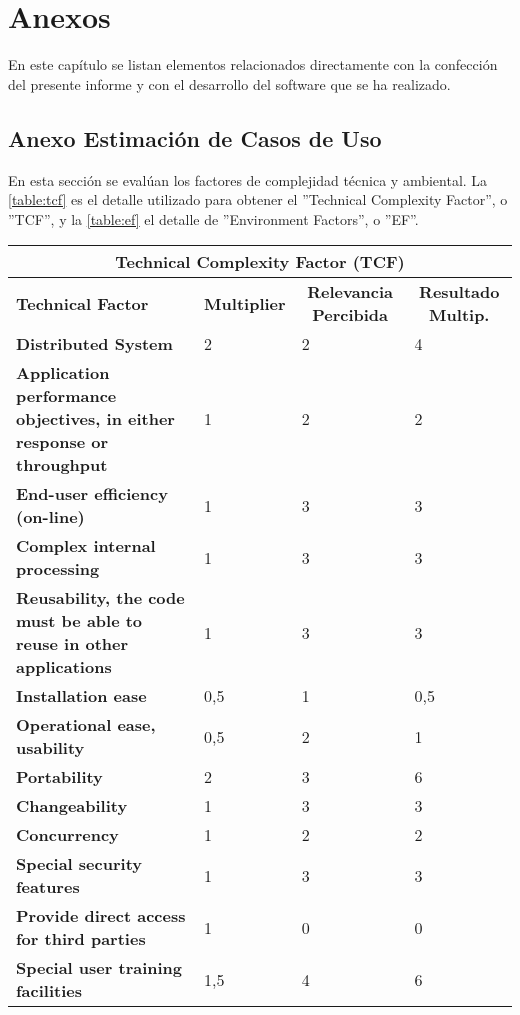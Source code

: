 \chapter{Anexos}
En este capítulo se listan elementos relacionados directamente con la confección del presente informe y con el desarrollo del software que se ha realizado.

\newpage

\section{Anexo Estimación de Casos de Uso}
En esta sección se evalúan los factores de complejidad técnica y ambiental. La \autoref{table:tcf} es el detalle utilizado para obtener el ''Technical Complexity Factor'', o ''TCF'', y la \autoref{table:ef} el detalle de ''Environment Factors'', o ''EF''.

\begin{center}
  \begin{tabular}{ | p{4cm} | p{2cm} | p{4cm}| p{4cm} | } 
    \hline
    \multicolumn{4}{|c|}{\textbf{Technical Complexity Factor (TCF)}} \\
    \hline
    \multicolumn{1}{|p{3cm}|}{\textbf{Technical Factor}} & \multicolumn{1}{|c|}{\textbf{Multiplier}} & \multicolumn{1}{|c|}{\textbf{Relevancia Percibida}} & \multicolumn{1}{|c|}{\textbf{Resultado Multip.}} \\
    \hline
    
    {\textbf{Distributed System}} & 2 & 2 & 4 \\ \hline
    {\textbf{Application performance objectives, in either response or throughput}} & 1 & 2 & 2 \\ \hline
    {\textbf{End-user efficiency (on-line)}} & 1 & 3 & 3 \\ \hline
    {\textbf{Complex internal processing}} & 1 & 3 & 3 \\ \hline
    {\textbf{Reusability, the code must be able to reuse in other applications}} & 1 & 3 & 3 \\ \hline
    {\textbf{Installation ease}} & 0,5 & 1 & 0,5 \\ \hline
    {\textbf{Operational ease, usability}} & 0,5 & 2 & 1 \\ \hline
    {\textbf{Portability}} & 2 & 3 & 6 \\ \hline
    {\textbf{Changeability}} & 1 & 3 & 3 \\ \hline
    {\textbf{Concurrency}} & 1 & 2 & 2 \\ \hline
    {\textbf{Special security features}} & 1 & 3 & 3 \\ \hline
    {\textbf{Provide direct access for third parties}} & 1 & 0 & 0 \\ \hline
    {\textbf{Special user training facilities}} & 1,5 & 4 & 6 \\ \hline
  \end{tabular}
  
  \label{table:tcf}
\end{center}

